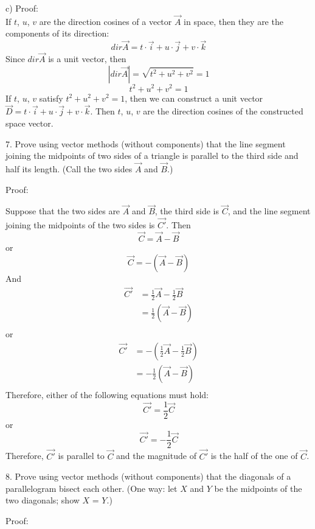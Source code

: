 \documentclass{article}
\begin{document}
c) Proof: \\
If $t$, $u$, $v$ are the direction cosines of a vector $\vec{A}$ in space, then 
they are the components of its direction:
\[
  dir \vec{A} = t \cdot \vec{i} + u \cdot \vec{j} + v \cdot \vec{k}
\]
Since $dir \vec{A}$ is a unit vector, then
\[
  |dir \vec{A}| = \sqrt{t^2 + u^2 + v^2} = 1
\]
\[
  t^2 + u^2 + v^2 = 1
\]
If $t$, $u$, $v$ satisfy $t^2 + u^2 + v^2 = 1$, then we can construct a unit 
vector $\vec{D} = t \cdot \vec{i} + u \cdot \vec{j} + v \cdot \vec{k}$. Then 
$t$, $u$, $v$ are the direction cosines of the constructed space vector.

7. Prove using vector methods (without components) that the line segment
joining the midpoints of two sides of a triangle is parallel to the third side
and half its length. (Call the two sides $\vec{A}$ and $\vec{B}$.)

Proof:

Suppose that the two sides are $\vec{A}$ and $\vec{B}$, the third side is 
$\vec{C}$, and the line segment joining the midpoints of the two sides is
$\vec{C'}$. Then
\[
  \vec{C} = \vec{A} - \vec{B}
\]
or
\[
  \vec{C} = -(\vec{A} - \vec{B})
\]
And
\[
  \begin{split}
    \vec{C'} &= \frac{1}{2}\vec{A} - \frac{1}{2}\vec{B} \\
             &= \frac{1}{2}(\vec{A} - \vec{B}) \\
  \end{split}
\]
or
\[
  \begin{split}
    \vec{C'} &= -(\frac{1}{2}\vec{A} - \frac{1}{2}\vec{B}) \\
             &= -\frac{1}{2}(\vec{A} - \vec{B}) \\
  \end{split}
\]
Therefore, either of the following equations must hold:
\[
  \vec{C'} = \frac{1}{2}\vec{C}
\]
or
\[
  \vec{C'} = -\frac{1}{2}\vec{C}
\]
Therefore, $\vec{C'}$ is parallel to $\vec{C}$ and the magnitude of $\vec{C'}$ 
is the half of the one of $\vec{C}$.

8. Prove using vector methods (without components) that the diagonals of a
parallelogram bisect each other. (One way: let $X$ and $Y$ be the midpoints of
the two diagonals; show $X$ = $Y$.)

Proof:

\end{document}
